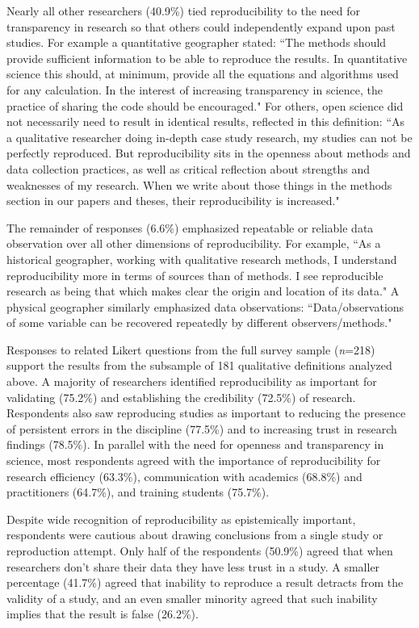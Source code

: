 \documentclass[]{interact}
\theoremstyle{plain}%
\theoremstyle{definition}
\theoremstyle{remark}
\begin{document}
Nearly all other researchers (40.9\%) tied reproducibility to the need for transparency in research so that others could independently expand upon past studies.
For example a quantitative geographer stated: ``The methods should provide sufficient information to be able to reproduce the results. In quantitative science this should, at minimum, provide all the equations and algorithms used for any calculation. In the interest of increasing transparency in science, the practice of sharing the code should be encouraged."
For others, open science did not necessarily need to result in identical results, reflected in this definition: ``As a qualitative researcher doing in-depth case study research, my studies can not be perfectly reproduced. But reproducibility sits in the openness about methods and data collection practices, as well as critical reflection about strengths and weaknesses of my research. When we write about those things in the methods section in our papers and theses, their reproducibility is increased." 

The remainder of responses (6.6\%) emphasized repeatable or reliable data observation over all other dimensions of reproducibility.
For example, ``As a historical geographer, working with qualitative research methods, I understand reproducibility more in terms of sources than of methods. I see reproducible research as being that which makes clear the origin and location of its data."
A physical geographer similarly emphasized data observations: ``Data/observations of some variable can be recovered repeatedly by different observers/methods."  

Responses to related Likert questions from the full survey sample (\textit{n}=218) support the results from the subsample of 181 qualitative definitions analyzed above.
A majority of researchers identified reproducibility as important for validating (75.2\%) and establishing the credibility (72.5\%) of research.  
Respondents also saw reproducing studies as important to reducing the presence of persistent errors in the discipline (77.5\%) and to increasing trust in research findings (78.5\%).
In parallel with the need for openness and transparency in science, most respondents agreed with the importance of reproducibility for research efficiency (63.3\%), communication with academics (68.8\%) and practitioners (64.7\%), and training students (75.7\%).

Despite wide recognition of reproducibility as epistemically important, respondents were cautious about drawing conclusions from a single study or reproduction attempt. 
Only half of the respondents (50.9\%) agreed that when researchers don't share their data they have less trust in a study.
A smaller percentage (41.7\%) agreed that inability to reproduce a result detracts from the validity of a study, and an even smaller minority agreed that such inability implies that the result is false (26.2\%).
\end{document}
